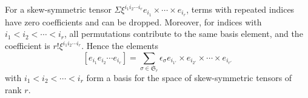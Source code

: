 For a skew-symmetric tensor $\Sigma \xi^{i_1 i_2 \cdots i_r} e_{i_1} \times \cdots \times e_{i_r}$, terms with repeated indices have zero coefficients and can be dropped. Moreover, for indices with $i_1 < i_2 < \cdots < i_r$, all permutations contribute to the same basis element, and the coefficient is $r! \xi^{i_1 i_2 \cdots i_r}$. Hence the elements
$$[e_{i_1} e_{i_2} \cdots e_{i_r}] = \sum_{\sigma \in \mathfrak{S}_r} \epsilon_{\sigma} e_{i_{1'}} \times e_{i_{2'}} \times \cdots \times e_{i_{r'}}$$
with $i_1 < i_2 < \cdots < i_r$ form a basis for the space of skew-symmetric tensors of rank $r$.
